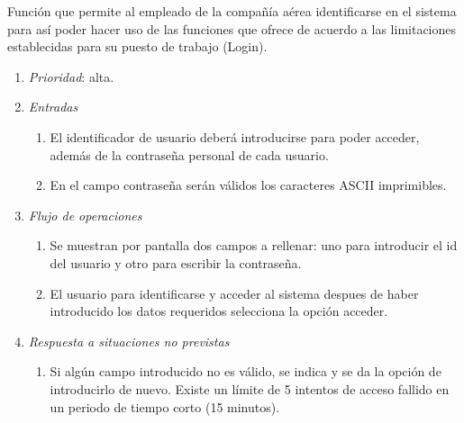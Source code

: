 
	Función que permite al empleado de la compañía aérea identificarse en el sistema para así poder hacer uso de las funciones que ofrece de acuerdo a las limitaciones establecidas para su puesto de trabajo (\gls{Login}).
		
	\begin{enumerate}
		\item \textit{Prioridad}: alta.
		\item \textit{Entradas}
		\begin{enumerate}
			\item El identificador de usuario deberá introducirse para poder acceder, además de la contraseña personal de cada usuario.
			\item En el campo contraseña serán válidos los caracteres ASCII imprimibles.
		\end{enumerate}
		\item \textit{Flujo de operaciones}
		\begin{enumerate}
			\item Se muestran por pantalla dos campos a rellenar: uno para introducir el id del usuario y otro para escribir la contraseña.
			\item El usuario para identificarse y acceder al sistema despues de haber introducido los datos requeridos selecciona la opción acceder.
		\end{enumerate}
		\item \textit{Respuesta a situaciones no previstas}
		\begin{enumerate}
			\item Si algún campo introducido no es válido, se indica y se da la opción de introducirlo de nuevo. Existe un límite de 5 intentos de acceso fallido en un periodo de tiempo corto (15 minutos).
		\end{enumerate}
	
\end{enumerate}
